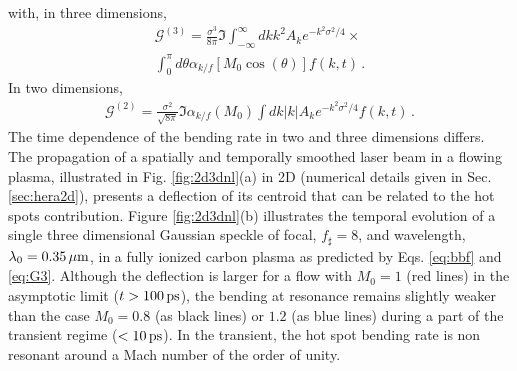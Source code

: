 \documentclass[%
 reprint,
 amsmath,amssymb,
 aps,
]{revtex4-1}
\begin{document}
  with, in three dimensions, 
\begin{align}
  \mathcal{G}^{(3)} =\frac{\sigma^3}{8\pi} \Im \int_{-\infty}^\infty dk  k^2  A_{k}e^{-k^2\sigma^2/4} \times\nonumber\\
\int_0^\pi d\theta \alpha_{k/f}[M_0\cos(\theta)] f(k,t) \, .\label{eq:G3}
\end{align}
In two dimensions, 
  \begin{align}
     \mathcal{G}^{(2)} = \frac{\sigma^2}{\sqrt{8\pi}} \Im \alpha_{k/f}(M_0)  
 \int d k \vert k\vert  A_{k}e^{-k^2\sigma^2/4} f(k,t) \, .\label{eq:G2} 
\end{align}
The time dependence  of the bending rate in two and three dimensions differs. 
The  propagation of a spatially and temporally smoothed laser beam in a flowing plasma, illustrated in Fig. \ref{fig:2d3dnl}(a) in 2D (numerical details given in Sec. \ref{sec:hera2d}), presents a deflection of its centroid that can be related to the hot spots contribution.
Figure \ref{fig:2d3dnl}(b) illustrates the temporal evolution of a single three dimensional Gaussian speckle  of focal, $f_\sharp=8$, and wavelength, $\lambda_0=0.35\,\rm\mu m$, in a fully ionized carbon plasma as predicted by Eqs. \eqref{eq:bbf} and \eqref{eq:G3}. Although the deflection is larger for a flow with $M_0=1$ (red lines) in the asymptotic limit ($t> 100 \,\rm ps$), the bending at resonance remains slightly weaker than the case $M_0=0.8$ (as black lines) or  $1.2$ (as blue lines) during a part of the transient regime ($<10 \,\rm ps$). In the transient, the hot spot bending rate is non resonant around a Mach number of the order of unity. 
\end{document}
